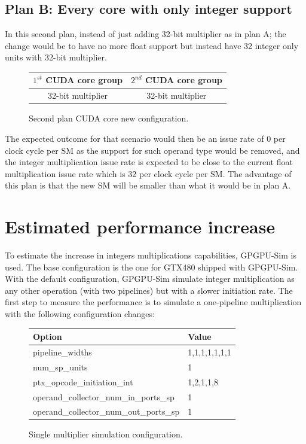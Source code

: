 \documentclass{report}
\begin{document}
   \subsection{Plan B: Every core with only integer support}
   In this second plan, instead of just adding 32-bit multiplier as in plan A; the change would be to have no more float support but instead have 32 integer only units with 32-bit multiplier.
   \begin{figure}[H]
      \centering
       \begin{tabular}{ | c | c | }
    	    \hline
    	    $1^{st}$ CUDA core group & $2^{nd}$ CUDA core group \\ \hline
    	   32-bit multiplier & 32-bit multiplier \\ \hline
  	\end{tabular}
  	\captionsetup{justification=centering}
  	\caption{Second plan CUDA core new configuration.}
  	\label{fig:planB_cores}
   \end{figure}
   The expected outcome for that scenario would then be an issue rate of 0 per clock cycle per SM as the support for
   such operand type would be removed, and the integer multiplication issue rate is expected to be close to the current float
   multiplication issue rate which is 32 per clock cycle per SM.
   The advantage of this plan is that the new SM will be smaller than what it would be in plan A. 
   \section{Estimated performance increase}
    To estimate the increase in integers multiplications capabilities, GPGPU-Sim
    is used. The base configuration is the one for GTX480 shipped with GPGPU-Sim.
    With the default configuration, GPGPU-Sim simulate integer multiplication as
    any other operation (with two pipelines) but with a slower initiation rate.
    The first step to measure the performance is to simulate a one-pipeline
    multiplication with the following configuration changes:
    \begin{figure}[H]
    \centering
       \begin{tabular}{ | l | l | }
            \hline
    	    Option & Value \\ \hline
    	    pipeline\_widths & 1,1,1,1,1,1,1 \\
            num\_sp\_units & 1 \\
            ptx\_opcode\_initiation\_int & 1,2,1,1,8 \\
            operand\_collector\_num\_in\_ports\_sp & 1 \\
            operand\_collector\_num\_out\_ports\_sp & 1 \\ \hline

  	    \end{tabular}
  	\captionsetup{justification=centering}
  	\caption{Single multiplier simulation configuration.}
  	\label{tab:1stconfig}
    \end{figure}
\end{document}
